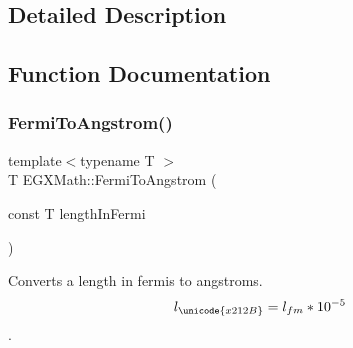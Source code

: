 \subsection{Detailed Description}


\subsection{Function Documentation}
\mbox{\label{group___e_g_x_math-_conversions-_length_conversions-_non-_s_i-_fermi-_non-_s_i_ga9bec1d5936dfd3fa360cf3484685cc23}} 
\subsubsection{\texorpdfstring{Fermi\+To\+Angstrom()}{FermiToAngstrom()}}
{\footnotesize\ttfamily template$<$typename T $>$ \\
T E\+G\+X\+Math\+::\+Fermi\+To\+Angstrom (\begin{DoxyParamCaption}\item[{const T}]{length\+In\+Fermi }\end{DoxyParamCaption})}



Converts a length in fermis to angstroms. \[ l_{\unicode{x212B}}=l_{fm} * 10^{-5} \]. 

